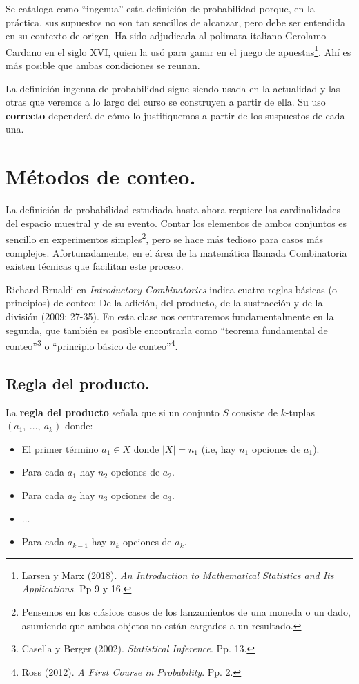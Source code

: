 \documentclass[12pt]{article}
\begin{document}
Se cataloga como ``ingenua'' esta definición de probabilidad porque, en la práctica, sus supuestos no son tan sencillos de alcanzar, pero debe ser entendida en su contexto de origen. Ha sido adjudicada al polimata italiano Gerolamo Cardano en el siglo XVI, quien la usó para ganar en el juego de apuestas\footnote{Larsen y Marx (2018). \textit{An Introduction to Mathematical Statistics and Its Applications}. Pp 9 y 16.}. Ahí es más posible que ambas condiciones se reunan.

La definición ingenua de probabilidad sigue siendo usada en la actualidad y las otras que veremos a lo largo del curso se construyen a partir de ella. Su uso \textbf{correcto} dependerá de cómo lo justifiquemos a partir de los suspuestos de cada una.


\section{Métodos de conteo.}

La definición de probabilidad estudiada hasta ahora requiere las cardinalidades del espacio muestral y de su evento. Contar los elementos de ambos conjuntos es sencillo en experimentos simples\footnote{Pensemos en los clásicos casos de los lanzamientos de una moneda o un dado, asumiendo que ambos objetos no están cargados a un resultado.}, pero se hace más tedioso para casos más complejos. Afortunadamente, en el área de la matemática llamada Combinatoria existen técnicas que facilitan este proceso.

Richard Brualdi en \textit{Introductory Combinatorics} indica cuatro reglas básicas (o principios) de conteo: De la adición, del producto, de la sustracción y de la división (2009: 27-35). En esta clase nos centraremos fundamentalmente en la segunda, que también es posible encontrarla como ``teorema fundamental de conteo''\footnote{Casella y Berger (2002). \textit{Statistical Inference}. Pp. 13.} o ``principio básico de conteo''\footnote{Ross (2012). \textit{A First Course in Probability}. Pp. 2.}.

\subsection{Regla del producto.}

La \textbf{regla del producto} señala que si un conjunto $S$ consiste de $k$-tuplas $(a_{1}, \ \ldots, \ a_{k})$ donde:

\begin{itemize}
\item El primer término $a_{1} \in X$ donde $|X| = n_{1}$ (i.e, hay $n_{1}$ opciones de $a_{1}$).
\item Para cada $a_{1}$ hay $n_{2}$ opciones de $a_{2}$.
\item Para cada $a_{2}$ hay $n_{3}$ opciones de $a_{3}$.
\item $\ldots$
\item Para cada $a_{k - 1}$ hay $n_{k}$ opciones de $a_{k}$.
\end{itemize}
\end{document}

